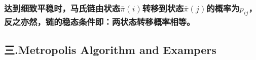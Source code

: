 \documentclass[11pt]{article}
\begin{document}
\subsubsection{\texorpdfstring{达到细致平稳时，马氏链由状态\(\bar\pi(i)\)转移到状态\(\bar\pi(j)\)的概率为\(p_{ij}\)，反之亦然，链的稳态条件即：两状态转移概率相等。}{达到细致平稳时，马氏链由状态\textbackslash{}bar\textbackslash{}pi(i)转移到状态\textbackslash{}bar\textbackslash{}pi(j)的概率为p\_\{ij\}，反之亦然，链的稳态条件即：两状态转移概率相等。}}\label{ux8fbeux5230ux7ec6ux81f4ux5e73ux7a33ux65f6ux9a6cux6c0fux94feux7531ux72b6ux6001barpiiux8f6cux79fbux5230ux72b6ux6001barpijux7684ux6982ux7387ux4e3ap_ijux53cdux4e4bux4ea6ux7136ux94feux7684ux7a33ux6001ux6761ux4ef6ux5373ux4e24ux72b6ux6001ux8f6cux79fbux6982ux7387ux76f8ux7b49}

    \subsection{三.Metropolis Algorithm and
Exampers}\label{ux4e09.metropolis-algorithm-and-exampers}


    
    
    
    
\end{document}
